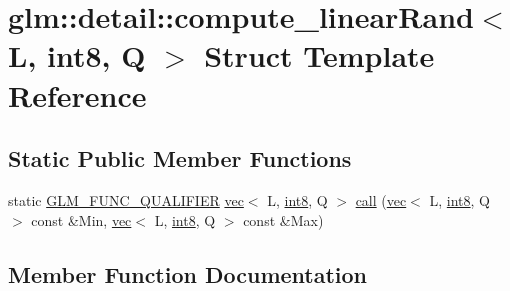 \hypertarget{structglm_1_1detail_1_1compute__linear_rand_3_01_l_00_01int8_00_01_q_01_4}{}\section{glm\+:\+:detail\+:\+:compute\+\_\+linear\+Rand$<$ L, int8, Q $>$ Struct Template Reference}
\label{structglm_1_1detail_1_1compute__linear_rand_3_01_l_00_01int8_00_01_q_01_4}
\subsection*{Static Public Member Functions}
\begin{DoxyCompactItemize}
\item 
static \hyperlink{setup_8hpp_a33fdea6f91c5f834105f7415e2a64407}{G\+L\+M\+\_\+\+F\+U\+N\+C\+\_\+\+Q\+U\+A\+L\+I\+F\+I\+ER} \hyperlink{structglm_1_1vec}{vec}$<$ L, \hyperlink{namespaceglm_1_1detail_a04b526a8d7a9b455602a0afa78c531e0}{int8}, Q $>$ \hyperlink{structglm_1_1detail_1_1compute__linear_rand_3_01_l_00_01int8_00_01_q_01_4_a77196d894abedcf8494dd983781432bf}{call} (\hyperlink{structglm_1_1vec}{vec}$<$ L, \hyperlink{namespaceglm_1_1detail_a04b526a8d7a9b455602a0afa78c531e0}{int8}, Q $>$ const \&Min, \hyperlink{structglm_1_1vec}{vec}$<$ L, \hyperlink{namespaceglm_1_1detail_a04b526a8d7a9b455602a0afa78c531e0}{int8}, Q $>$ const \&Max)
\end{DoxyCompactItemize}


\subsection{Member Function Documentation}
\mbox{\label{structglm_1_1detail_1_1compute__linear_rand_3_01_l_00_01int8_00_01_q_01_4_a77196d894abedcf8494dd983781432bf}} 
